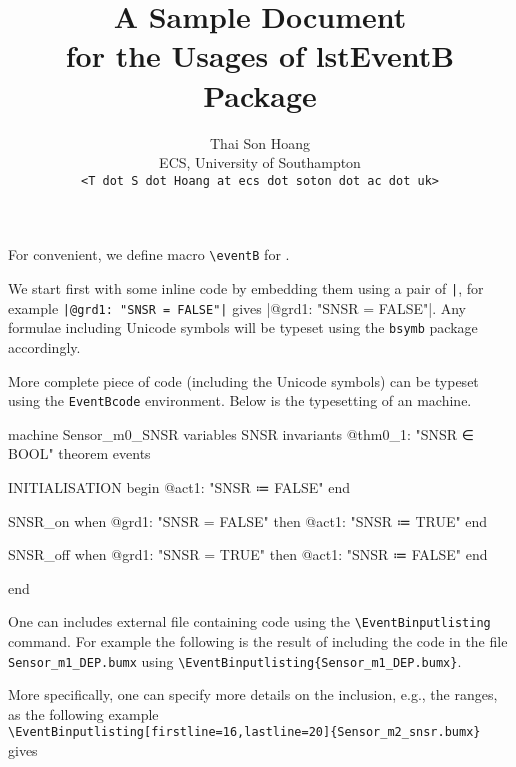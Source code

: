 \usepackage{verbatim}
\usepackage{mdframed}
\title{A Sample Document\\for the Usages of \textsf{lstEventB} Package}
\author{Thai Son Hoang\\ECS, University of Southampton\\\texttt{<T dot S dot Hoang at ecs dot soton dot ac dot uk>}}


\maketitle
For convenient, we define macro \verb|\eventB| for \eventB. 

We start first with some inline \eventB code by embedding them using a pair of \verb$|$, for example \verb$|@grd1: "SNSR = FALSE"|$ gives |@grd1: "SNSR = FALSE"|. Any \eventB formulae including Unicode symbols will be typeset using the \verb|bsymb| package accordingly.

More complete piece of code (including the Unicode symbols) can be typeset using the \verb|EventBcode| environment. Below is the typesetting of an \eventB machine.
\begin{EventBcode}
machine Sensor_m0_SNSR
variables
	SNSR
invariants
	@thm0_1: "SNSR ∈ BOOL" theorem
events

	INITIALISATION
	begin
		@act1: "SNSR ≔ FALSE"
	end

	SNSR_on
	when
		@grd1: "SNSR = FALSE"
	then
		@act1: "SNSR ≔ TRUE"
	end

	SNSR_off
	when
		@grd1: "SNSR = TRUE"
	then
		@act1: "SNSR ≔ FALSE"
	end

end
\end{EventBcode}

One can includes external file containing \eventB code using the \verb|\EventBinputlisting| command.  For example the following is the result of including the code in the file \verb|Sensor_m1_DEP.bumx| using \verb|\EventBinputlisting{Sensor_m1_DEP.bumx}|.

More specifically, one can specify more details on the inclusion, e.g., the ranges, as the following example\\
\verb|\EventBinputlisting[firstline=16,lastline=20]{Sensor_m2_snsr.bumx}|
gives



